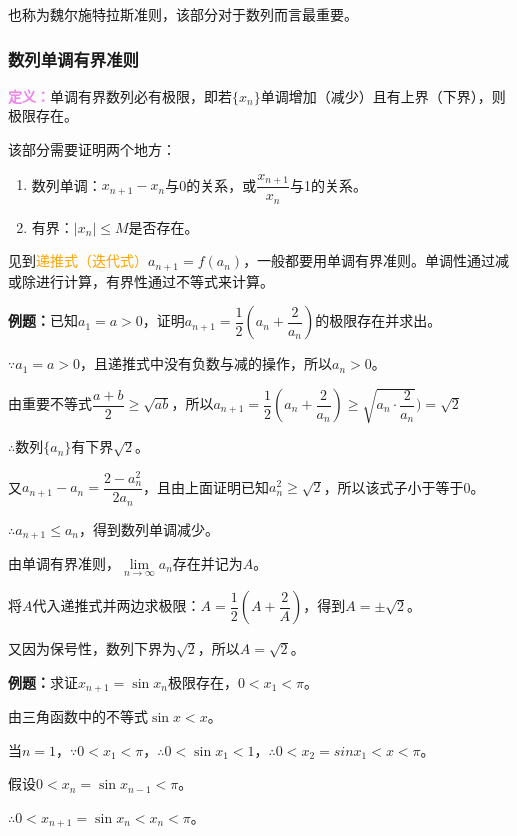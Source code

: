 \documentclass[UTF8, 12pt]{ctexart}
\begin{document}
也称为魏尔施特拉斯准则，该部分对于数列而言最重要。

\subsubsection{数列单调有界准则}

\textcolor{violet}{\textbf{定义：}}单调有界数列必有极限，即若$\{x_n\}$单调增加（减少）且有上界（下界），则极限存在。

该部分需要证明两个地方：

\begin{enumerate}
    \item 数列单调：$x_{n+1}-x_n$与0的关系，或$\dfrac{x_{n+1}}{x_n}$与1的关系。
    \item 有界：$\vert x_n\vert\leqslant M$是否存在。
\end{enumerate}

见到\textcolor{orange}{递推式（迭代式）}$a_{n+1}=f(a_n)$，一般都要用单调有界准则。单调性通过减或除进行计算，有界性通过不等式来计算。

\textbf{例题：}已知$a_1=a>0$，证明$a_{n+1}=\dfrac{1}{2}\left(a_n+\dfrac{2}{a_n}\right)$的极限存在并求出。

$\because a_1=a>0$，且递推式中没有负数与减的操作，所以$a_n>0$。

由重要不等式$\dfrac{a+b}{2}\geqslant\sqrt{ab}$，所以$a_{n+1}=\dfrac{1}{2}\left(a_n+\dfrac{2}{a_n}\right)\geqslant\sqrt{a_n\cdot\dfrac{2}{a_n}})=\sqrt{2}$

$\therefore$数列$\{a_n\}$有下界$\sqrt{2}$。

又$a_{n+1}-a_n=\dfrac{2-a_n^2}{2a_n}$，且由上面证明已知$a_n^2\geqslant\sqrt{2}$，所以该式子小于等于0。

$\therefore a_{n+1}\leqslant a_n$，得到数列单调减少。

由单调有界准则，$\lim\limits_{n\to\infty}a_n$存在并记为$A$。

将$A$代入递推式并两边求极限：$A=\dfrac{1}{2}(A+\dfrac{2}{A})$，得到$A=\pm\sqrt{2}$。

又因为保号性，数列下界为$\sqrt{2}$，所以$A=\sqrt{2}$。

\textbf{例题：}求证$x_{n+1}=\sin x_n$极限存在，$0<x_1<\pi$。

由三角函数中的不等式$\sin x<x$。

当$n=1$，$\because 0<x_1<\pi$，$\therefore 0<\sin x_1<1$，$\therefore 0<x_2=sin x_1<x<\pi$。

假设$0<x_n=\sin x_{n-1}<\pi$。

$\therefore 0<x_{n+1}=\sin x_n<x_n<\pi$。
\end{document}
